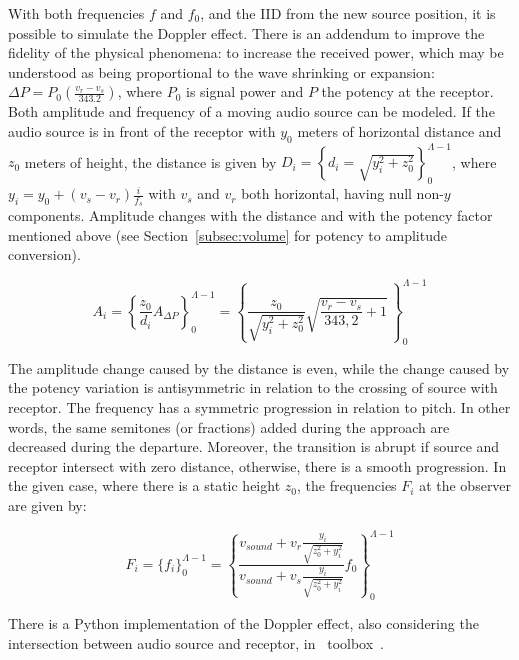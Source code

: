 With both frequencies $f$ and $f_0$, and the IID from the new source
position, it is possible to simulate the Doppler effect. There is an addendum to improve the fidelity of the physical phenomena: to increase the received power, which may be understood as being proportional to the wave shrinking or expansion: $\Delta P=P_0\left(\frac{v_r-v_s}{343.2}\right)$,
 where $P_0$ is signal power and $P$ the potency at the receptor. Both amplitude and frequency of a moving audio source can be modeled. If the audio source is in front of the receptor with $y_0$ meters of horizontal distance and $z_0$ meters of height, the distance is given by
$D_i=\left\{ d_i=\sqrt{ y_{i}^{2}+z_{0}^{2} } \right\}_0^{\Lambda-1}$,
where $y_i=y_0+(v_s-v_r)\frac{i}{f_s}$ with $v_s$ and $v_r$ both
horizontal, having null non-$y$ components. Amplitude changes with the distance and with the potency factor mentioned above (see Section~\ref{subsec:volume} for potency to amplitude conversion).

\begin{equation}\label{eq:aDoppler}
    A_i=\left\{ \frac{z_0}{d_i}A_{\Delta P}\right\}_0^{\Lambda-1} = \left\{ \frac{z_0}{\sqrt{y_i^2+z_0^2}} \sqrt{\frac{v_r-v_s}{343,2}+1}  \,\right\}_0^{\Lambda-1}
\end{equation}

The amplitude change caused by the distance is even, while the change caused by the potency variation is antisymmetric in
relation to the crossing of source with receptor. The frequency has a symmetric progression in relation to pitch. In other words, the same semitones (or fractions) added during the approach are decreased during the departure. Moreover, the transition is abrupt if source and receptor intersect with zero distance, otherwise, there is a smooth progression.
In the given case, where there is a static height $z_0$, the frequencies $F_i$ at the observer are given by:

\begin{equation}\label{eq:ffDoppler}
    F_i=\{f_i\}_0^{\Lambda-1}=\left\{\frac{v_{sound} + v_r\frac{y_i}{\sqrt{z_0^2+y_i^2}}}{v_{sound}+v_s\frac{y_i}{\sqrt{z_0^2+y_i^2}}}f_0\right\}_0^{\Lambda-1}
\end{equation}

There is a Python implementation of the Doppler effect, also considering the intersection between audio source and receptor, in \massa\ toolbox~\cite{MASSA}.

